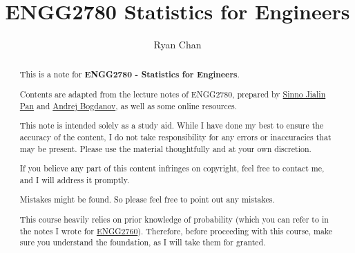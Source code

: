 \documentclass[a4paper]{report}
\author{Ryan Chan}
\title{ENGG2780 Statistics for Engineers}
\begin{document}
\setlength\parindent{0pt}

\maketitle

\newpage

\begin{abstract}
	This is a note for \textbf{ENGG2780 - Statistics for Engineers}.
	
	Contents are adapted from the lecture notes of ENGG2780, prepared by \href{https://www.cse.cuhk.edu.hk/~sinnopan/}{Sinno Jialin Pan} and \href{https://andrejb.net}{Andrej Bogdanov}, as well as some online resources.

	This note is intended solely as a study aid. While I have done my best to ensure the accuracy of the content, I do not take responsibility for any errors or inaccuracies that may be present. Please use the material thoughtfully and at your own discretion.
	
	If you believe any part of this content infringes on copyright, feel free to contact me, and I will address it promptly.

	Mistakes might be found. So please feel free to point out any mistakes.
	
	This course heavily relies on prior knowledge of probability (which you can refer to in the notes I wrote for \href{https://www.ryansloom.com/files/ENGG2760.pdf}{ENGG2760}). Therefore, before proceeding with this course, make sure you understand the foundation, as I will take them for granted.
\end{abstract}

\newpage

\tableofcontents

\setlength{\parskip}{5pt}
\appendix

\end{document}
